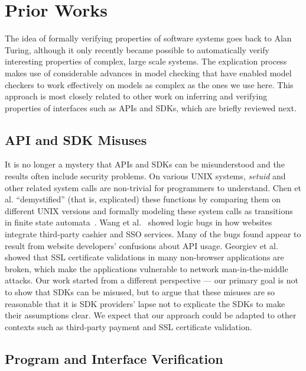\section{Prior Works}
\label{sec:explicating_prior_works}

The idea of formally verifying properties of software systems goes back to Alan Turing, although it only recently became possible to automatically verify interesting properties of complex, large scale systems.  The explication process makes use of considerable advances in model checking that have enabled model checkers to work effectively on models as complex as the ones we use here.  This approach is most closely related to other work on inferring and verifying properties of interfaces such as APIs and SDKs, which are briefly reviewed next.

\subsection{API and SDK Misuses}

It is no longer a mystery that APIs and SDKs can be misunderstood and the results often include security problems.  On various UNIX systems, \emph{setuid} and other related system calls are non-trivial for programmers to understand.  Chen et al. ``demystified'' (that is, explicated) these functions by comparing them on different UNIX versions and formally modeling these system calls as transitions in finite state automata~\cite{Chen:2002:SD:647253.720278}.  Wang et al.~\cite{Wang:2011:SFO:2006077.2006782,Wang:2012:SMY:2310656.2310691} showed logic bugs in how websites integrate third-party cashier and SSO services.  Many of the bugs found appear to result from website developers' confusions about API usage. Georgiev et al.~\cite{Georgiev:2012:MDC:2382196.2382204} showed that SSL certificate validations in many non-browser applications are broken, which make the applications vulnerable to network man-in-the-middle attacks.  Our work started from a different perspective --- our primary goal is not to show that SDKs can be misused, but to argue that these misuses are so reasonable that it is SDK providers' lapse not to explicate the SDKs to make their assumptions clear.  We expect that our approach could be adapted to other contexts such as third-party payment and SSL certificate validation. 

\subsection{Program and Interface Verification}

